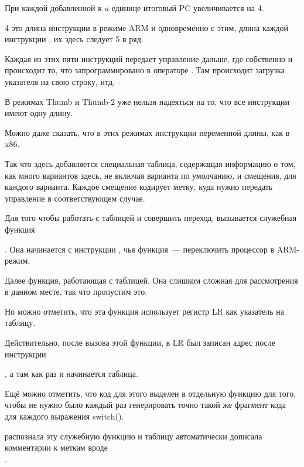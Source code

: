 При каждой добавленной к $a$ единице итоговый \ac{PC} увеличивается на 4.

4 это длина инструкции в режиме ARM и одновременно с этим, 
длина каждой инструкции , их здесь следует 5 в ряд.

Каждая из этих пяти инструкций  передает управление дальше, где собственно и происходит то, 
что запрограммировано в операторе .
Там происходит загрузка указателя на свою строку, итд.




В режимах Thumb и Thumb-2 уже нельзя надеяться на то, что все инструкции имеют одну длину.

Можно даже сказать, что в этих режимах инструкции переменной длины, как в x86.

Так что здесь добавляется специальная таблица, содержащая информацию о том, как много вариантов здесь,
не включая варианта по умолчанию, и смещения, для каждого варианта. Каждое смещение кодирует метку, куда нужно передать
управление в соответствующем случае.

Для того чтобы работать с таблицей и совершить переход, вызывается служебная функция

. 
Она начинается с инструкции , чья функция~--- переключить процессор в ARM-режим.

Далее функция, работающая с таблицей. 
Она слишком сложная для рассмотрения в данном месте, так что пропустим это.


Но можно отметить, что эта функция использует регистр \ac{LR} как указатель на таблицу.

Действительно, после вызова этой функции, в \ac{LR} был записан адрес после инструкции

, а там как раз и начинается таблица.

Ещё можно отметить, что код для этого выделен в отдельную функцию для того, 
чтобы не нужно было каждый раз генерировать 
точно такой же фрагмент кода для каждого выражения switch().

\IDA распознала эту служебную функцию и таблицу автоматически дописала комментарии к меткам вроде \\
.

